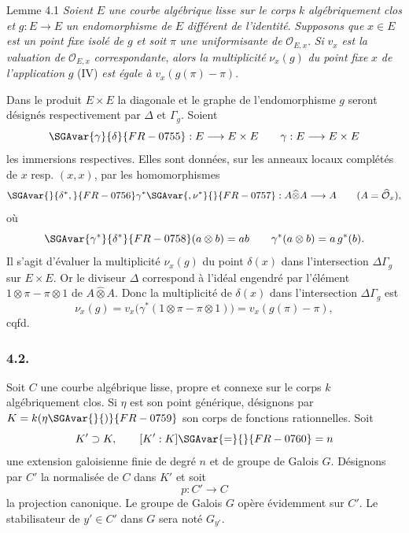 \begin{statement}{Lemme 4.1}
\emph{Soient} $E$ \emph{une courbe algébrique lisse sur le corps} $k$ \emph{algébriquement clos et} $g:E\to E$ \emph{un endomorphisme de} $E$ \emph{différent de l'identité}. \emph{Supposons que} $x\in E$ \emph{est un point fixe isolé de} $g$ \emph{et soit} $\pi$ \emph{une uniformisante de} $\mathcal{O}_{E,x}$. \emph{Si} $v_x$ \emph{est la valuation de} $\mathcal{O}_{E,x}$ \emph{correspondante}, \emph{alors la multiplicité} $\nu_x(g)$ \emph{du point fixe} $x$ \emph{de l'application} $g$ (IV) \emph{est égale à} $v_x(g(\pi)-\pi)$.
\end{statement}


Dans le produit $E\times E$ la diagonale et le graphe de l'endomorphisme $g$ seront désignés respectivement par $\Delta$ et $\Gamma_g$. Soient
\[
\SGAvar{\gamma}{\delta}{FR-0755}:E\longrightarrow E\times E\qquad
\gamma:E\longrightarrow E\times E
\]
les immersions respectives. Elles sont données, sur les anneaux locaux complétés de $x$ resp. $(x,x)$, par les homomorphismes
\[
\SGAvar{}{\delta^*,}{FR-0756}\gamma^*\SGAvar{,\nu^*}{}{FR-0757}:A\widehat\otimes A\longrightarrow A
\qquad (A=\widehat{\mathcal{O}}_x),
\]
où
\[
\SGAvar{\gamma^*}{\delta^*}{FR-0758}(a\otimes b)=ab\qquad
\gamma^*(a\otimes b)=a\,g^*(b).
\]
Il s'agit d'évaluer la multiplicité $\nu_x(g)$ du point $\delta(x)$ dans l'intersection $\Delta\Gamma_g$ sur $E\times E$. Or le diviseur $\Delta$ correspond à l'idéal engendré par l'élément $1\otimes\pi-\pi\otimes1$ de $A\widehat\otimes A$. Donc la multiplicité de $\delta(x)$ dans l'intersection $\Delta\Gamma_g$ est
\[
\nu_x(g)=v_x\bigl(\gamma^*(1\otimes\pi-\pi\otimes1)\bigr)
      =v_x(g(\pi)-\pi),
\]
cqfd.

\subsubsection*{4.2.}

Soit $C$ une courbe algébrique lisse, propre et connexe sur le corps $k$ algébriquement clos. Si $\eta$ est son point générique, désignons par $K=k(\eta\SGAvar{}{)}{FR-0759}$ son corps de fonctions rationnelles.
Soit
\[
K'\supset K,\qquad [K':K]\SGAvar{=}{}{FR-0760}=n
\]
une extension galoisienne finie de degré $n$ et de groupe de Galois $G$. Désignons par $C'$ la normalisée de $C$ dans $K'$ et soit
\[
p:C'\longrightarrow C
\]
la
projection canonique. Le groupe de Galois $G$ opère évidemment sur $C'$. Le stabilisateur de $y'\in C'$ dans $G$ sera noté $G_{y'}$.

